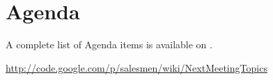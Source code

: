 \documentclass[a4paper, 12pt]{article}
\begin{document}
		\section{Agenda}
A complete list of Agenda items is available on \cite{agendaitems}.\\
	
	\begin{thebibliography}{99}
		
		
		\href{http://code.google.com/p/salesmen/wiki/NextMeetingTopics}{http://code.google.com/p/salesmen/wiki/NextMeetingTopics}

		
	\end{thebibliography}	
		
\end{document}
